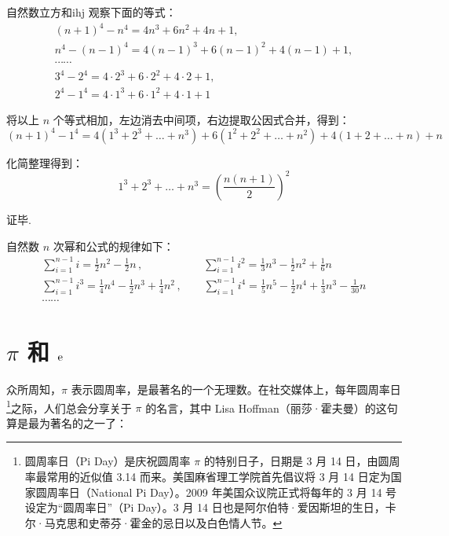 \documentclass[12pt, cn]{elegantart}
\begin{document}
\begin{definition}{自然数立方和}{ihj}
	观察下面的等式：
$$\begin{array}{l}
{(n+1)^{4}-n^{4}=4 n^{3}+6 n^{2}+4 n+1}, \\ {n^{4}-(n-1)^{4}=4(n-1)^{3}+6(n-1)^{2}+4(n-1)+1}, \\ {\cdots \cdots} \\ {3^{4}-2^{4}=4 \cdot 2^{3}+6 \cdot 2^{2}+4 \cdot 2+1}, \\ {2^{4}-1^{4}=4 \cdot 1^{3}+6 \cdot 1^{2}+4 \cdot 1+1}
\end{array}$$

将以上 $n$ 个等式相加，左边消去中间项，右边提取公因式合并，得到：
$$
(n+1)^{4}-1^{4}=4\left(1^{3}+2^{3}+\dots+n^{3}\right)+6\left(1^{2}+2^{2}+\dots+n^{2}\right)+4(1+2+\dots+n)+n$$

化简整理得到：
$$
1^{3}+2^{3}+\dots+n^{3}=\left(\frac{n(n+1)}{2}\right)^{2}$$

证毕.

\end{definition}

\noindent 自然数 $n$ 次幂和公式的规律如下：
$$
\begin{array}{l}
{\sum_{i=1}^{n-1} i=\frac{1}{2} n^{2}-\frac{1}{2} n}\,, \quad\quad\quad\quad\quad\;\ {\sum_{i=1}^{n-1} i^{2}=\frac{1}{3} n^{3}-\frac{1}{2} n^{2}+\frac{1}{6} n} \\[15pt] {\sum_{i=1}^{n-1} i^{3}=\frac{1}{4} n^{4}-\frac{1}{2} n^{3}+\frac{1}{4} n^{2}}\,, \quad\quad {\sum_{i=1}^{n-1} i^{4}=\frac{1}{5} n^{5}-\frac{1}{2} n^{4}+\frac{1}{3} n^{3}-\frac{1}{30} n} \\ \cdots\cdots
\end{array}
$$

\section{$\pi$ 和 $\mathrm{e}$}

众所周知，$\pi$ 表示圆周率，是最著名的一个无理数。在社交媒体上，每年圆周率日\footnote{圆周率日（Pi Day）是庆祝圆周率 $\pi$ 的特别日子，日期是 3 月 14 日，由圆周率最常用的近似值 3.14 而来。美国麻省理工学院首先倡议将 3 月 14 日定为国家圆周率日（National Pi Day）。2009 年美国众议院正式将每年的 3 月 14 号设定为“圆周率日”（Pi Day）。3 月 14 日也是阿尔伯特·爱因斯坦的生日，卡尔·马克思和史蒂芬·霍金的忌日以及白色情人节。}之际，人们总会分享关于 $\pi$ 的名言，其中 Lisa Hoffman（丽莎·霍夫曼）的这句算是最为著名的之一了：
\vspace{5pt}
\end{document}
